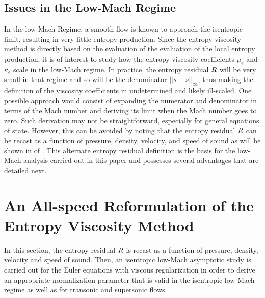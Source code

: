 \subsection{Issues in the Low-Mach Regime} 
In the low-Mach Regime, a smooth flow is known to approach the isentropic limit, resulting in very little 
entropy production. Since the entropy viscosity method is directly based on the evaluation of the evaluation of the local entropy production, it is of interest to study how the entropy viscosity coefficients $\mu_e$ and $\kappa_e$ scale in the low-Mach regime. In practice, the entropy residual $R$ will be very small in that regime and so will be the denominator $|| s - \bar{s} ||_\infty$, thus making the definition of the viscosity coefficients in  undetermined and likely ill-scaled.  One possible approach would consist of expanding the numerator and denominator in terms of the Mach number and deriving its limit when the Mach number goes to zero. Such derivation may not be straightforward, especially for general equations of state. However, this can be avoided by noting that the entropy residual $R$ can be recast as a function of pressure, density, velocity, and speed of sound as will be shown in  of . This alternate entropy residual definition is the basis for the low-Mach analysis carried out in this paper and possesses several advantages that are detailed next. %

\section{An All-speed Reformulation of the Entropy Viscosity Method} \label{sec:extension}

In this section, the entropy residual $R$ is recast as a function of pressure, density, velocity and speed of sound. Then, an isentropic low-Mach asymptotic study is carried out for the Euler equations with viscous regularization in order to derive an appropriate normalization parameter that is valid in the isentropic low-Mach regime as well as for transonic and supersonic flows. 


